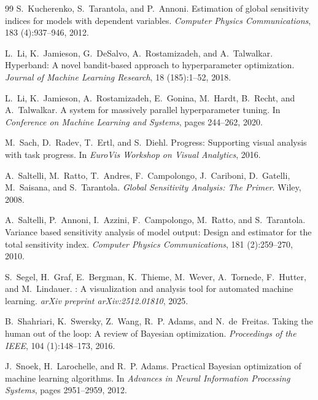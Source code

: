 \documentclass[11pt,a4paper]{ctexart}
\begin{document}
\begin{thebibliography}{99}
S.~Kucherenko, S.~Tarantola, and P.~Annoni.
\newblock Estimation of global sensitivity indices for models with dependent variables.
\newblock \emph{Computer Physics Communications}, 183 (4):937--946, 2012.

L.~Li, K.~Jamieson, G.~DeSalvo, A.~Rostamizadeh, and A.~Talwalkar.
\newblock Hyperband: A novel bandit-based approach to hyperparameter optimization.
\newblock \emph{Journal of Machine Learning Research}, 18 (185):1--52, 2018.

L.~Li, K.~Jamieson, A.~Rostamizadeh, E.~Gonina, M.~Hardt, B.~Recht, and A.~Talwalkar.
\newblock A system for massively parallel hyperparameter tuning.
\newblock In \emph{Conference on Machine Learning and Systems}, pages 244--262, 2020.

M.~Sach, D.~Radev, T.~Ertl, and S.~Diehl.
\newblock Progress: Supporting visual analysis with task progress.
\newblock In \emph{EuroVis Workshop on Visual Analytics}, 2016.

A.~Saltelli, M.~Ratto, T.~Andres, F.~Campolongo, J.~Cariboni, D.~Gatelli, M.~Saisana, and S.~Tarantola.
\newblock \emph{Global Sensitivity Analysis: The Primer}.
\newblock Wiley, 2008.

A.~Saltelli, P.~Annoni, I.~Azzini, F.~Campolongo, M.~Ratto, and S.~Tarantola.
\newblock Variance based sensitivity analysis of model output: Design and estimator for the total sensitivity index.
\newblock \emph{Computer Physics Communications}, 181 (2):259--270, 2010.

S.~Segel, H.~Graf, E.~Bergman, K.~Thieme, M.~Wever, A.~Tornede, F.~Hutter, and M.~Lindauer.
: A visualization and analysis tool for automated machine learning.
\newblock \emph{arXiv preprint arXiv:2512.01810}, 2025.

B.~Shahriari, K.~Swersky, Z.~Wang, R.~P. Adams, and N.~de~Freitas.
\newblock Taking the human out of the loop: A review of {Bayesian} optimization.
\newblock \emph{Proceedings of the IEEE}, 104 (1):148--173, 2016.

J.~Snoek, H.~Larochelle, and R.~P. Adams.
\newblock Practical {Bayesian} optimization of machine learning algorithms.
\newblock In \emph{Advances in Neural Information Processing Systems}, pages 2951--2959, 2012.


\end{thebibliography}
\end{document}
